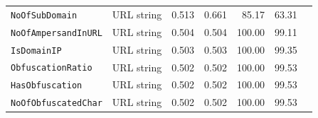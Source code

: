 \begin{tabular}{@{}llrrrrc@{}}
\texttt{NoOfSubDomain} & URL string & 0.513 & 0.661 & 85.17 & 63.31 & \\
\texttt{NoOfAmpersandInURL} & URL string & 0.504 & 0.504 & 100.00 & 99.11 & \\
\texttt{IsDomainIP} & URL string & 0.503 & 0.503 & 100.00 & 99.35 & \\
\texttt{ObfuscationRatio} & URL string & 0.502 & 0.502 & 100.00 & 99.53 & \\
\texttt{HasObfuscation} & URL string & 0.502 & 0.502 & 100.00 & 99.53 & \\
\texttt{NoOfObfuscatedChar} & URL string & 0.502 & 0.502 & 100.00 & 99.53 & \\
\bottomrule
\end{tabular}